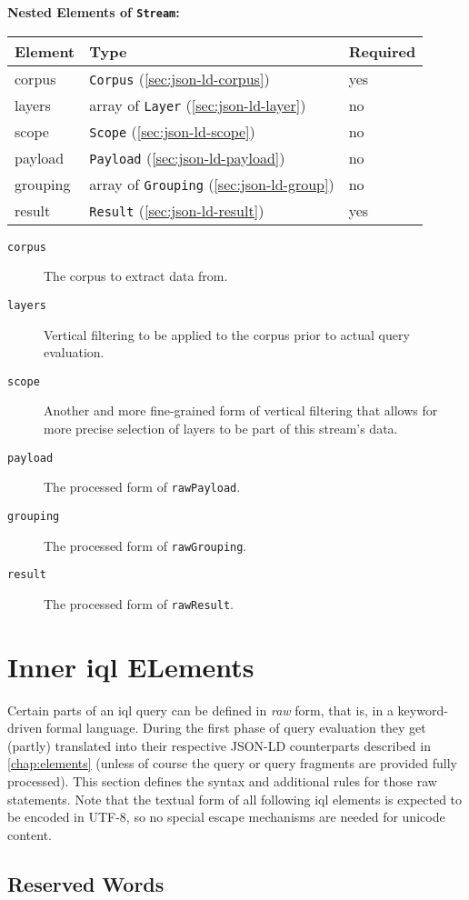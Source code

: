 \documentclass[11pt,a4paper]{report}
\newcommand{\iqlType}[1]{\texttt{\iqlns#1}}
\newenvironment{elements}[1]{
	\noindent\textbf{Nested Elements of #1:}\newline\medskip
	\begin{tabular}{|p{0.3\textwidth}|p{0.42\textwidth}|p{0.17\textwidth}|}
		\hline
		\textbf{Element} & \textbf{Type} & \textbf{Required} \\ 
		\hline
		\hline
	}{
	\end{tabular}
}
\newcommand{\element}[3]{
	#1 & #2 & #3 \\
	\hline
}
\begin{document}
\begin{elements}{\iqlType{Stream}}
	\element{corpus}{\iqlType{Corpus} (\ref{sec:json-ld-corpus})}{yes}
	\element{layers}{array of \iqlType{Layer} (\ref{sec:json-ld-layer})}{no}
	\element{scope}{\iqlType{Scope} (\ref{sec:json-ld-scope})}{no}
	\element{payload}{\iqlType{Payload} (\ref{sec:json-ld-payload})}{no}
	\element{grouping}{array of \iqlType{Grouping} (\ref{sec:json-ld-group})}{no}
	\element{result}{\iqlType{Result} (\ref{sec:json-ld-result})}{yes}
\end{elements}
\begin{description}
	\item[\iqlType{corpus}] The corpus to extract data from.
	\item[\iqlType{layers}] Vertical filtering to be applied to the corpus prior to actual query evaluation.
	\item[\iqlType{scope}] Another and more fine-grained form of vertical filtering that allows for more precise selection of layers to be part of this stream's data.
	\item[\iqlType{payload}] The processed form of \iqlType{rawPayload}.
	\item[\iqlType{grouping}] The processed form of \iqlType{rawGrouping}.
	\item[\iqlType{result}] The processed form of \iqlType{rawResult}.
\end{description}


\chapter{Inner \ac{iql} ELements}
\label{chap:inner-iql-elements}

Certain parts of an \ac{iql} query can be defined in \textit{raw} form, that is, in a keyword-driven formal language.
During the first phase of query evaluation they get (partly) translated into their respective JSON-LD counterparts described in \cref{chap:elements} (unless of course the query or query fragments are provided fully processed).
This section defines the syntax and additional rules for those raw statements.
Note that the textual form of all following \ac{iql} elements is expected to be encoded in UTF-8, so no special escape mechanisms are needed for unicode content.


\section{Reserved Words}
\label{sec:reserved-words}
\end{document}
